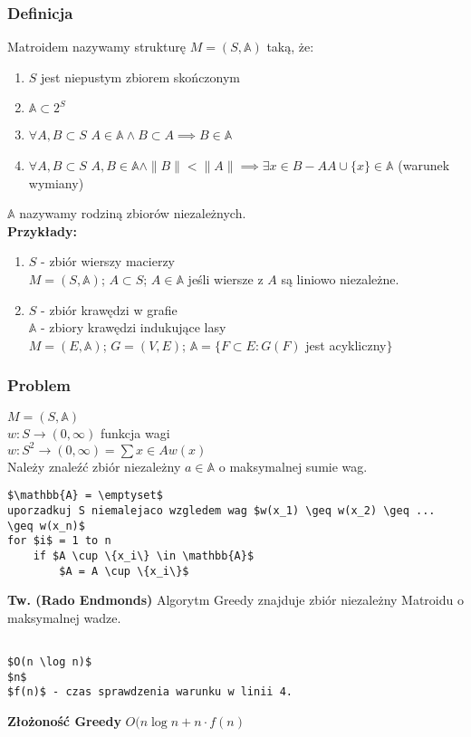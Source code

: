 \subsubsection{Definicja}
Matroidem nazywamy strukturę $M = (S,\mathbb{A})$ taką, że:
\begin{enumerate}
	\item $S$ jest niepustym zbiorem skończonym
	\item $\mathbb{A} \subset 2^S$
	\item $\forall A,B \subset S$   $A \in \mathbb{A} \land B \subset A \implies B \in \mathbb{A}$
	\item $\forall A,B \subset S$ 	$A,B \in \mathbb{A} \land \|B\| < \|A\| \implies \exists x \in B - A A \cup \{x\} \in \mathbb{A} $ (warunek wymiany)
\end{enumerate}
$\mathbb{A}$ nazywamy rodziną zbiorów niezależnych.
\\

\textbf{Przykłady:} 
\begin{enumerate}
	\item $S$ - zbiór wierszy macierzy \\
	$M = (S,\mathbb{A})$;
	$A \subset S$;
	$A\in\mathbb{A}$ jeśli wiersze z $A$ są liniowo niezależne.

	\item $S$ - zbiór krawędzi w grafie \\
	$\mathbb{A}$ - zbiory krawędzi indukujące lasy \\
	$M = (E,\mathbb{A})$;  
	$G = (V,E)$;     
	$\mathbb{A} = \{F \subset E : G(F)$ jest acykliczny$\}$
\end{enumerate}

\subsubsection{Problem}
$M = (S,\mathbb{A})$\\
$w:S \rightarrow (0,\infty)$ funkcja wagi \\
$w:S^2 \rightarrow (0, \infty) = \sum{x\in A} w(x)$ \\
Należy znaleźć zbiór niezależny $a \in \mathbb{A}$ o maksymalnej sumie wag.
\begin{lstlisting}[caption={Greedy(M,w)}]
$\mathbb{A} = \emptyset$
uporzadkuj S niemalejaco wzgledem wag $w(x_1) \geq w(x_2) \geq ... \geq w(x_n)$
for $i$ = 1 to n
	if $A \cup \{x_i\} \in \mathbb{A}$
		$A = A \cup \{x_i\}$
\end{lstlisting}

\textbf{Tw. (Rado Endmonds)} Algorytm Greedy znajduje zbiór niezależny Matroidu o maksymalnej wadze. \\
\begin{lstlisting}

$O(n \log n)$
$n$
$f(n)$ - czas sprawdzenia warunku w linii 4.

\end{lstlisting}

\textbf{Złożoność Greedy} $O(n \log n + n \cdot f(n)$
